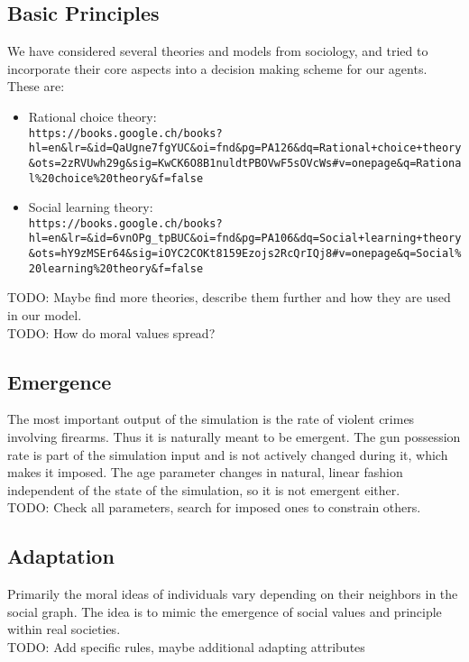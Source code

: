 \documentclass{article}
\begin{document}
		\subsection{Basic Principles}
			We have considered several theories and models from sociology, and tried to incorporate
			their core aspects into a decision making scheme for our agents. These are:
			\begin{itemize}
				\item Rational choice theory:\\
					\verb|https://books.google.ch/books?hl=en&lr=&id=QaUgne7fgYUC&oi=fnd&pg=PA126&dq=Rational+choice+theory&ots=2zRVUwh29g&sig=KwCK6O8B1nuldtPBOVwF5sOVcWs#v=onepage&q=Rational%20choice%20theory&f=false|

				\item Social learning theory:\\
					\verb|https://books.google.ch/books?hl=en&lr=&id=6vnOPg_tpBUC&oi=fnd&pg=PA106&dq=Social+learning+theory&ots=hY9zMSEr64&sig=iOYC2COKt8159Ezojs2RcQrIQj8#v=onepage&q=Social%20learning%20theory&f=false|
			\end{itemize}
			TODO: Maybe find more theories, describe them further and how they are used in our model.\\
			TODO: How do moral values spread?

		\subsection{Emergence}
			The most important output of the simulation is the rate of violent crimes involving
			firearms. Thus it is naturally meant to be emergent. The gun possession rate is part
			of the simulation input and is not actively changed during it, which makes it imposed.
			The age parameter changes in natural, linear fashion independent of the state of the
			simulation, so it is not emergent either.\\
			TODO: Check all parameters, search for imposed ones to constrain others.

		\subsection{Adaptation}
			Primarily the moral ideas of individuals vary depending on their neighbors in the social
			graph. The idea is to mimic the emergence of social values and principle within real
			societies.\\
			TODO: Add specific rules, maybe additional adapting attributes
\end{document}
